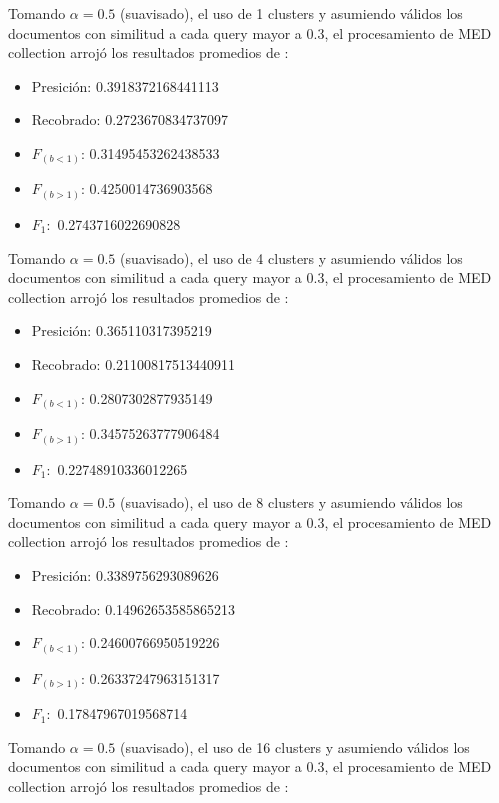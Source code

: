 \documentclass{llncs}
\begin{document}
	\begin{flushleft}
		Tomando $\alpha=0.5$ (suavisado), el uso de 1 clusters y asumiendo v\'alidos los documentos con similitud a cada query mayor a 0.3, el procesamiento de MED collection arroj\'o los resultados promedios de :
		
		\begin{itemize}
			\item Presici\'on: 0.3918372168441113
			\item Recobrado: 0.2723670834737097
			\item $F_{(b<1)}$: 0.31495453262438533
			\item $F_{(b>1)}$: 0.4250014736903568
			\item $F_1:$ 0.2743716022690828
		\end{itemize}
		
		Tomando $\alpha=0.5$ (suavisado), el uso de 4 clusters y asumiendo v\'alidos los documentos con similitud a cada query mayor a 0.3, el procesamiento de MED collection arroj\'o los resultados promedios de :
		
		\begin{itemize}
			\item Presici\'on:  0.365110317395219
			\item Recobrado:  0.21100817513440911
			\item $F_{(b<1)}$: 0.2807302877935149
			\item $F_{(b>1)}$: 0.34575263777906484
			\item $F_1:$ 0.22748910336012265 
		\end{itemize}
		
		
		Tomando $\alpha=0.5$ (suavisado), el uso de 8 clusters y asumiendo v\'alidos los documentos con similitud a cada query mayor a 0.3, el procesamiento de MED collection arroj\'o los resultados promedios de :
		
		\begin{itemize}
			\item Presici\'on:  0.3389756293089626
			\item Recobrado:  0.14962653585865213
			\item $F_{(b<1)}$: 0.24600766950519226
			\item $F_{(b>1)}$:  0.26337247963151317
			\item $F_1:$ 0.17847967019568714
		\end{itemize}
		
		Tomando $\alpha=0.5$ (suavisado), el uso de 16 clusters y asumiendo v\'alidos los documentos con similitud a cada query mayor a 0.3, el procesamiento de MED collection arroj\'o los resultados promedios de :
		

\end{flushleft}
\end{document}
